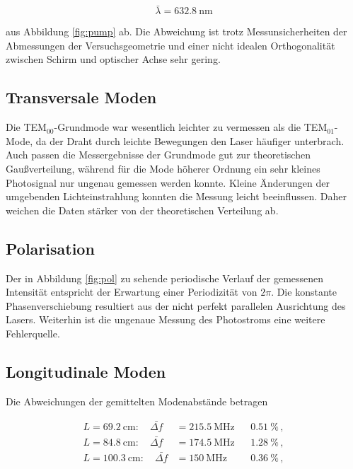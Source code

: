 \vspace{-5pt}
\begin{equation*}
    \bar{\lambda} = \SI{632.8}{\nano\meter}
\end{equation*}

aus Abbildung \ref{fig:pump} ab. Die Abweichung ist trotz Messunsicherheiten der
Abmessungen der Versuchsgeometrie und einer nicht idealen Orthogonalität zwischen
Schirm und optischer Achse sehr gering.

\subsection{Transversale Moden}

Die TEM$_{00}$-Grundmode war wesentlich leichter zu vermessen als die TEM$_{01}$-Mode,
da der Draht durch leichte Bewegungen den Laser häufiger unterbrach.
Auch passen die Messergebnisse der Grundmode gut zur theoretischen Gaußverteilung,
während für die Mode höherer Ordnung ein sehr kleines Photosignal nur ungenau 
gemessen werden konnte. Kleine Änderungen der umgebenden Lichteinstrahlung 
konnten die Messung leicht beeinflussen. Daher weichen die Daten stärker
von der theoretischen Verteilung ab.

\subsection{Polarisation}

Der in Abbildung \ref{fig:pol} zu sehende periodische Verlauf
der gemessenen Intensität entspricht der Erwartung einer Periodizität von $2\pi$.
Die konstante Phasenverschiebung resultiert aus der nicht perfekt parallelen Ausrichtung
des Lasers. Weiterhin ist die ungenaue Messung des Photostroms eine weitere Fehlerquelle.

\subsection{Longitudinale Moden}

Die Abweichungen der gemittelten Modenabstände betragen

\vspace{-15pt}
\begin{align*}
    L = \SI{ 69.2}{\centi\meter}: \quad \bar{\Delta f} &= \SI{215.5}{\mega\hertz} & &\SI{0.51}{\percent}\, , \\  
    L = \SI{ 84.8}{\centi\meter}: \quad \bar{\Delta f} &= \SI{174.5}{\mega\hertz} & &\SI{1.28}{\percent}\, , \\  
    L = \SI{100.3}{\centi\meter}: \quad \bar{\Delta f} &= \SI{150}{\mega\hertz}   & &\SI{0.36}{\percent}\, ,  
\end{align*}

